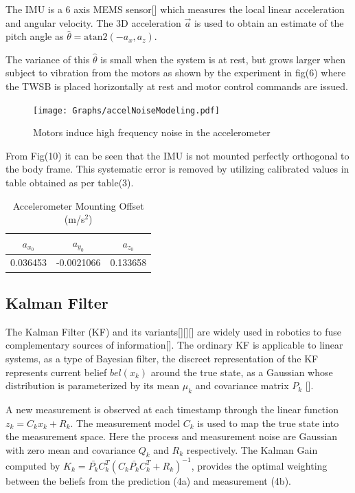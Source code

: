         The IMU is a 6 axis MEMS sensor[] which measures the local linear acceleration 
        and angular velocity.
        The 3D acceleration $\vec{a}$ is used to obtain an 
        estimate of the pitch angle as $\hat{\theta} = \mathrm{atan2}\left(-a_x ,a_z \right)$. 

        The variance of this $\hat{\theta}$ is small when the system is at rest, but grows larger when subject to vibration from the motors
        as shown by the experiment in fig(6) where the TWSB is placed horizontally at rest and motor control commands are issued. 
        \begin{figure}[H]
            \centering
            \texttt{[image: Graphs/accelNoiseModeling.pdf]}
            \caption{Motors induce high frequency noise in the accelerometer}
        \end{figure}

        From Fig(10) it can be seen that the IMU is not mounted perfectly orthogonal to the body frame. 
        This systematic error is removed by utilizing calibrated values in table obtained as per table(3).

        \begin{table}[H]
            \centering
            \begin{tabular}{c c c} 
                \toprule
                $a_{x_0}$ & $a_{y_0}$ & $a_{z_0}$ \\
                \midrule
                0.036453 & -0.0021066 & 0.133658 \\
                \bottomrule
            \end{tabular}
            \caption{Accelerometer Mounting Offset (m/s$^{2}$)}
        \end{table}
        
        
        \pagebreak{}
        \subsection{Kalman Filter}
        The Kalman Filter (KF) and its variants[][][] are widely used in robotics to fuse 
        complementary sources of information[]. 
        The ordinary KF is applicable to linear systems, as a type of Bayesian filter, 
        the discreet representation of the KF represents current belief $bel(x_k)$ around the true state,
        as a Gaussian whose distribution is parameterized by its mean $\mu_k$ and covariance matrix $P_k$ []. 

        A new measurement is observed at each timestamp through the linear function $z_k = C_k x_k + R_k$. 
        The measurement model $C_k$ is used to map the true state into the measurement space.
        Here the process and measurement noise are Gaussian with zero mean and covariance $Q_k$ and $R_k$ respectively. 
        The Kalman Gain computed by $ K_k = \bar{P_k} C_k^T \left(C_k \bar{P_k} C_k^T + R_k \right)^{-1}$, 
        provides the optimal weighting between the beliefs from the prediction (4a) and measurement (4b). 
     
